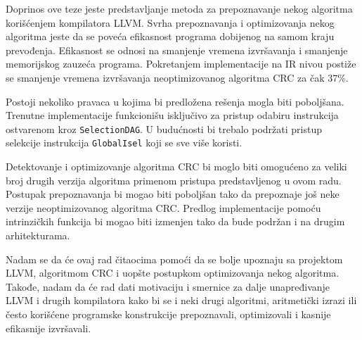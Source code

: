 \documentclass[12pt,oneside]{memoir}
\begin{document}
Doprinos ove teze jeste predstavljanje metoda za prepoznavanje nekog algoritma korišćenjem kompilatora LLVM. Svrha prepoznavanja i optimizovanja nekog algoritma jeste da se poveća efikasnost programa dobijenog na samom kraju prevođenja. Efikasnost se odnosi na smanjenje vremena izvršavanja i smanjenje memorijskog zauzeća programa. Pokretanjem implementacije na IR nivou postiže se smanjenje vremena izvršavanja neoptimizovanog algoritma CRC za čak 37\%. 

Postoji nekoliko pravaca u kojima bi predložena rešenja mogla biti poboljšana.
Trenutne implementacije funkcionišu isključivo za pristup odabiru instrukcija ostvarenom kroz \texttt{SelectionDAG}. U budućnosti bi trebalo podržati pristup selekcije instrukcija \texttt{GlobalIsel} koji se sve više koristi. 

Detektovanje i optimizovanje algoritma CRC bi moglo biti omogućeno za veliki broj drugih verzija algoritma primenom pristupa predstavljenog u ovom radu. Postupak prepoznavanja bi mogao biti poboljšan tako da prepoznaje još neke verzije neoptimizovanog algoritma CRC. Predlog implementacije pomoću intrinzičkih funkcija bi mogao biti izmenjen tako da bude podržan i na drugim arhitekturama.

Nadam se da će ovaj rad čitaocima pomoći da se bolje upoznaju sa projektom LLVM, algoritmom CRC i uopšte postupkom optimizovanja nekog algoritma. Takođe, nadam da će rad dati motivaciju i smernice za dalje unapređivanje LLVM i drugih kompilatora kako bi se i neki drugi algoritmi, aritmetički izrazi ili često korišćene programske konstrukcije prepoznavali, optimizovali i kasnije efikasnije izvršavali.


\literatura

\backmatter
\end{document}
